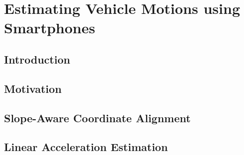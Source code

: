 
\chapter{Estimating Vehicle Motions using Smartphones} 

\section{Introduction}



\section{Motivation}




\section{Slope-Aware Coordinate Alignment}
\label{section_alignment}


\section{Linear Acceleration Estimation}







